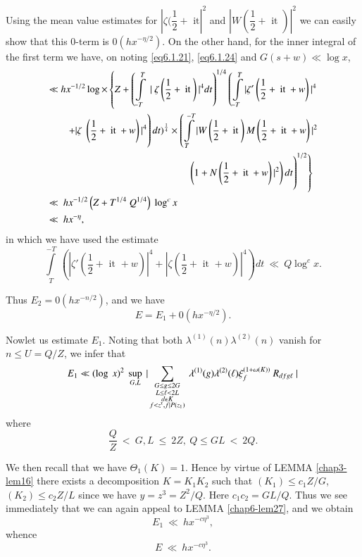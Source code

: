 Using the mean value estimates for $|\zeta(\dfrac{1}{2}+\text{ it
}|^2$ and $|W(\dfrac{1}{2}+\text{ it })|^2$ we can easily show that
this 0-term is $0(hx^{-\eta/2})$. On the other hand, for the inner
integral of the first term we have, on noting \eqref{eq6.1.21},
\eqref{eq6.1.24} and $G(s+w) \ll \log x$, 
\begin{align*}
  & \ll hx^{-1/2}\log \times \left\{ Z + \left(\int\limits_{-T}^{T} ~ | ~
  \zeta\left(\frac{1}{2}+\text{ it }\right) |^4 dt\right)^{1/4}
  \left(\int\limits_{-T}^{T}|\zeta'\left(\frac{1}{2}+ \text{ it
  }+w\right)|^4\right.\right. \\ 
  & \left.\qquad + |\zeta
  \left.{\vphantom{\int\limits_{-T}^{T}}}\left(\frac{1}{2} + ~\text{it}~
  + w \right) |^4\right)dt)^{\frac{1}{4}} \times 
  \left(\int\limits^{-T}_{T}|W\left(\frac{1}{2}+\text{ it }\right)
  M\left(\frac{1}{2}+\text{ it }+w\right)|^2\right.\right.\\
  & \hspace{5cm}\left.\left.\left(1+N\left(\frac{1}{2}+\text{ it
  }+w\right)|^2
  \right)dt{\vphantom{\int\limits_{-T}^{T}}}\right)^{1/2}\right\}\\  
  & \ll~ hx^{-1/2}\left(Z + T^{1/4}~Q^{1/4}\right)~\log^c x\\
  & \ll ~ hx^{-\eta},
\end{align*}
in which we have used the estimate
$$
\int\limits_{T}^{-T}~\left(|\zeta'\left(\frac{1}{2}+\text{ it }+w\right)|^4+
|\zeta\left(\frac{1}{2}+\text{ it }+w\right)|^4\right)dt~\ll ~Q \log^cx. 
$$

Thus $E_2 = 0(hx^{-n/2})$, and we have
$$
E = E_1 + 0(hx^{-\eta /2}).
$$

Now\pageoriginale let us estimate $E_1$. Noting that both
$\lambda^{(1)}(n)\lambda^{(2)}(n)$ vanish for $n \leq U = Q/Z$, we
infer that  
$$
E_1 \ll (\log ~x)^2 ~\sup_{G, L}~ | \sum_{\substack{G\le g \le 2G
    \\ L\le \ell < 2L \\ d \epsilon  K \\ f < z^{\tauup},f|P(z_1)}}
~ \lambda^{(1)}(g)\lambda^{(2)}(\ell)\xi_f^{(1+\omega(K))} ~
R_{dfg\ell} ~| 
$$
where
$$
\frac{Q}{Z} ~ < ~ G,L ~ \le ~ 2Z,~Q \le GL ~ < ~2Q. 
$$

We then recall that we have $\Theta_1(K) = 1$. Hence by virtue of
LEMMA \ref{chap3-lem16} there exists a decomposition $K = K_1K_2$ such that
$(K_1)\le c_1Z/G$, $(K_2) \le c_2 Z/L$ since we have $y = z^3 =
Z^2/Q$. Here $c_1c_2 = GL/Q$. Thus we see immediately that we can
again appeal to LEMMA \ref{chap6-lem27}, and we obtain 
$$
E_1 ~\ll~hx^{-c\eta^3},
$$
whence 
$$
E ~ \ll ~ hx^{-c\eta^3}.
$$

